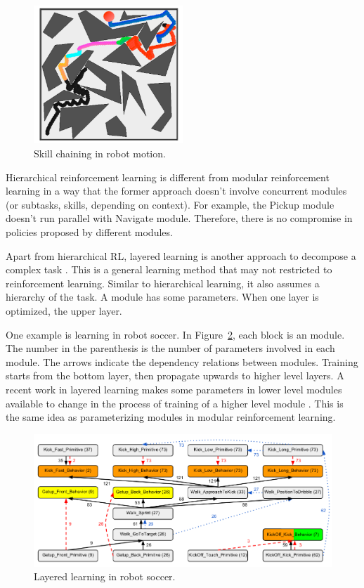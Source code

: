 \begin{figure}[h]
\centering
\includegraphics[width=0.5\textwidth]{skills}
\caption{Skill chaining in robot motion.}
\label{fig:skills}
\end{figure}

Hierarchical reinforcement learning is different from modular reinforcement
learning in a way that the former approach doesn't involve concurrent modules
(or subtasks, skills, depending on context).
For example, the Pickup module doesn't run parallel with Navigate module.
Therefore, there is no compromise in policies proposed by different modules.

Apart from hierarchical RL, layered learning is another approach to decompose a
complex task \cite{stone2000layered}. This is a general learning method that may
not restricted to reinforcement learning. Similar to hierarchical learning, it
also assumes a hierarchy of the task. A module has some parameters. When one
layer is optimized, the upper layer.

One example is learning in robot soccer. In Figure~\ref{fig:soccer}, each block
is an module. The number in the parenthesis is the number of parameters involved
in each module. The arrows indicate the dependency relations between modules.
Training starts from the bottom layer, then propagate upwards to higher level
layers.
A recent work in layered learning makes some parameters in lower level modules
available to change in the process of training of a higher level module
\cite{macalpine2015ut}. This is the same idea as parameterizing modules in
modular reinforcement learning. 

\begin{figure}[h]
\centering
\includegraphics[width=\textwidth]{layered}
\caption{Layered learning in robot soccer. \cite{macalpine2015ut}}
\label{fig:soccer}
\end{figure}

